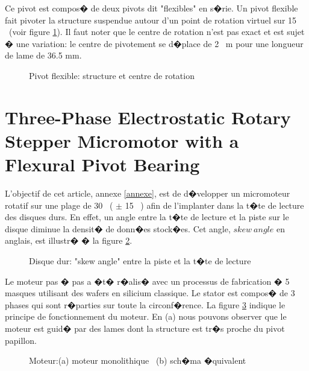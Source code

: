\noindent Ce pivot est compos� de deux pivots dit "flexibles" en s�rie. Un pivot flexible fait pivoter la structure suspendue autour d'un point de rotation virtuel sur 15 \degre  \  (voir figure \ref{fig: schema_pivot_flexible_art}).  
Il faut noter que le centre de rotation n'est pas exact et est sujet � une variation: le centre de pivotement se d�place de 2 ~\textmu m pour une longueur de lame de 36.5 mm.

\begin{figure}[!ht]
\centering
\caption{Pivot flexible: structure et centre de rotation}
\label{fig: schema_pivot_flexible_art}
\end{figure}




\section{Three-Phase Electrostatic Rotary Stepper Micromotor with a Flexural Pivot Bearing \cite{confidential}}

L'objectif de cet article, annexe \ref{annexe}, est de d�velopper un micromoteur rotatif sur une plage de 30 \degre  \ (  $\pm $ 15 \degre  \ ) afin de l'implanter dans la t�te de lecture des disques durs. En effet, un angle entre la t�te de lecture et la piste sur le disque diminue la densit� de donn�es stock�es. Cet angle, $skew \ angle$ en anglais, est illustr� � la figure \ref{fig: schema_HDD}. 

\begin{figure}[!ht]
\centering
\caption{Disque dur: "skew angle" entre la piste et la t�te de lecture}
\label{fig: schema_HDD}
\end{figure}

Le moteur pas � pas a �t� r�alis� avec un processus de fabrication � 5 masques utilisant des wafers en silicium classique. Le stator est compos� de 3 phases qui sont r�parties sur toute la circonf�rence.
La figure \ref{fig: image_moteur_JMEMS} indique le principe de fonctionnement du moteur. En (a) nous pouvons observer que le moteur est guid� par des lames dont la structure est tr�s proche du pivot papillon.


\begin{figure}[!ht]
\centering
\caption{Moteur:(a) moteur monolithique \ (b) sch�ma �quivalent}
\label{fig: image_moteur_JMEMS}
\end{figure}

